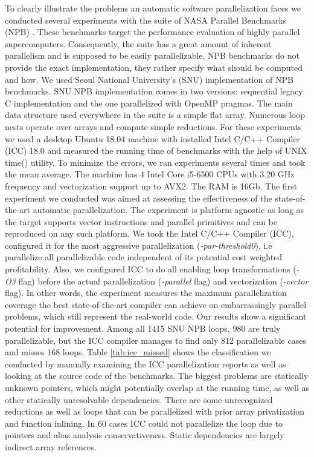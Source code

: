 \quad To clearly illustrate the problems an automatic software parallelization faces we conducted several experiments with the suite of NASA Parallel Benchmarks (NPB) \cite{nasa-parallel-benchmarks}. These benchmarks target the performance evaluation of highly parallel supercomputers. Consequently, the suite has a great amount of inherent parallelism and is supposed to be easily parallelizable. NPB benchmarks do not provide the exact implementation, they rather specify what should be computed and how. We used Seoul National University's (SNU) implementation \cite{snu-npb-benchmarks} of NPB benchmarks. SNU NPB implementation comes in two versions: sequential legacy C implementation and the one parallelized with OpenMP pragmas. The main data structure used everywhere in the suite is a simple flat array. Numerous loop nests operate over arrays and compute simple reductions.\newline\null
\quad For these experiments we used a desktop Ubuntu 18.04 machine with installed Intel C/C++ Compiler (ICC) 18.0 and measured the running time of benchmarks with the help of UNIX time() utility. To minimize the errors, we ran experiments several times and took the mean average. The machine has 4 Intel Core i5-6500 CPUs with 3.20 GHz frequency and vectorization support up to AVX2. The RAM is 16Gb.\newline\null
\quad The first experiment we conducted was aimed at assessing the effectiveness of the state-of-the-art automatic parallelization. The experiment is platform agnostic as long as the target supports vector instructions and parallel primitives and can be reproduced on any such platform. We took the Intel C/C++ Compiler (ICC), configured it for the most aggressive parallelization (\textit{-par-threshold0}), i.e parallelize all parallelizable code independent of its potential cost weighted profitability. Also, we configured ICC to do all enabling loop transformations (\textit{-O3} flag) before the actual parallelization (\textit{-parallel} flag) and vectorization (\textit{-vector} flag). In other words, the experiment measures the maximum parallelization coverage the best state-of-the-art compiler can achieve on embarrassingly parallel problems, which still represent the real-world code. Our results show a significant potential for improvement. Among all 1415 SNU NPB loops, 980 are truly parallelizable, but the ICC compiler manages to find only 812 parallelizable cases and misses 168 loops. Table \ref{tab:icc_missed} shows the classification we conducted by manually examining the ICC parallelization reports as well as looking at the source code of the benchmarks. The biggest problems are statically unknown pointers, which might potentially overlap at the running time, as well as other statically unresolvable dependencies. There are some unrecognized reductions as well as loops that can be parallelized with prior array privatization and function inlining. In 60 cases ICC could not parallelize the loop due to pointers and alias analysis conservativeness. Static dependencies are largely indirect array references.
